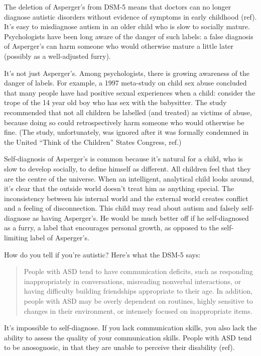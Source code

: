 The deletion of Asperger's from DSM-5 means that doctors can no longer diagnose autistic disorders without evidence of symptoms in early childhood (ref). It's easy to misdiagnose autism in an older child who is slow to socially mature. Psychologists have been long aware of the danger of such labels: a false diagnosis of Asperger's can harm someone who would otherwise mature a little later (possibly as a well-adjusted furry).

It's not just Asperger's. Among psychologists, there is growing awareness of the danger of labels. For example, a 1997 meta-study on child sex abuse concluded that many people have had positive sexual experiences when a child: consider the trope of the 14 year old boy who has sex with the babysitter. The study recommended that not all children be labelled (and treated) as victims of abuse, because doing so could retrospectively harm someone who would otherwise be fine. (The study, unfortunately, was ignored after it was formally condemned in the United ``Think of the Children'' States Congress, ref.)

Self-diagnosis of Asperger's is common because it's natural for a child, who is slow to develop socially, to define himself as different. All children feel that they are the centre of the universe. When an intelligent, analytical child looks around, it's clear that the outside world doesn't treat him as anything special. The inconsistency between his internal world and the external world creates conflict and a feeling of disconnection. This child may read about autism and falsely self-diagnose as having Asperger's. He would be much better off if he self-diagnosed as a furry, a label that encourages personal growth, as opposed to the self-limiting label of Asperger's.

How do you tell if you're autistic? Here's what the DSM-5 says:

\begin{quote}
  People with ASD tend to have communication deficits, such as responding inappropriately in conversations, misreading nonverbal interactions, or having difficulty building friendships appropriate to their age. In addition, people with ASD may be overly dependent on routines, highly sensitive to changes in their environment, or intensely focused on inappropriate items.
\end{quote}

It's impossible to self-diagnose. If you lack communication skills, you also lack the ability to assess the quality of your communication skills. People with ASD tend to be anosognosic, in that they are unable to perceive their disability (ref).

